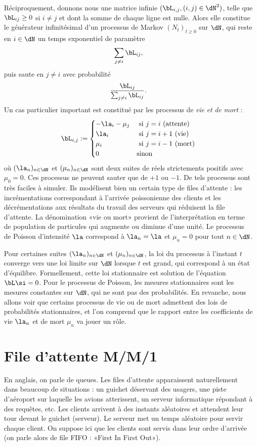 {{Réciproquement, donnons nous une matrice infinie $(\bL_{i,j},(i,j)\in\dN^2)$,
telle que $\bL_{ij}\geq 0$ si $i\neq j$ et dont la somme de chaque ligne est
nulle. Alors elle constitue le générateur infinitésimal d'un processus de
Markov $(N_t)_{t\geq 0}$ sur $\dN$, qui reste en $i\in\dN$ un temps
exponentiel de paramètre
$$
\sum_{j\neq i}\bL_{ij},
$$
puis saute en $j\neq i$ avec probabilité
$$
\frac{\bL_{ij}}{\sum_{j\neq i}\bL_{ij}}.
$$
Un cas particulier important est constitué par les processus de \emph{vie
  et de mort} :
$$
\bL_{i,j}:=
\begin{cases}
  -\la_{i}-\mu_j & \text{ si $j=i$ (attente)} \\
  \la_{i} & \text{ si $j=i+1$ (vie)} \\
  \mu_{i} & \text{ si $j=i-1$ (mort)} \\
  0 & \text{sinon}
\end{cases}
$$
où $(\la_n)_{n\in\dN}$ et $(\mu_n)_{n\in\dN}$ sont deux suites de réels
strictements positifs avec $\mu_0=0$. Ces processus ne peuvent sauter que de
$+1$ ou $-1$. De tels processus sont très faciles à simuler. Ils modélisent
bien un certain type de files d'attente : les incrémentations correspondant à
l'arrivée poissonienne des clients et les décrémentations aux résultats du
travail des serveurs qui réduisent la file d'attente.  La dénomination «vie ou
mort» provient de l'interprétation en terme de population de particules qui
augmente ou diminue d'une unité. Le processus de Poisson d'intensité $\la$
correspond à $\la_n=\la$ et $\mu_n=0$ pour tout $n\in\dN$.

Pour certaines suites $(\la_n)_{n\in\dN}$ et $(\mu_n)_{n\in\dN}$, la loi du
processus à l'instant $t$ converge vers une loi limite sur $\dN$ lorsque $t$
est grand, qui correspond à un état d'équilibre. Formellement, cette loi
stationnaire est solution de l'équation $\bL\si=0$. Pour le processus de
Poisson, les mesures stationnaires sont les mesures constantes sur $\dN$, qui
ne sont pas des probabilités. En revanche, nous allons voir que certains
processus de vie ou de mort admettent des lois de probabilités stationnaires,
et l'on comprend que le rapport entre les coefficients de vie $\la_n$ et de
mort $\mu_n$ va jouer un rôle.

%
\section{File d'attente M/M/1}
%

En anglais, on parle de queues. Les files d'attente apparaissent naturellement
dans beaucoup de situations : un guichet déservant des usagers, une piste
d'aéroport sur laquelle les avions atterissent, un serveur informatique
répondant à des requêtes, etc.  Les clients arrivent à des instants aléatoires
et attendent leur tour devant le guichet (serveur). Le serveur met un temps
aléatoire pour servir chaque client.  On suppose ici que les clients sont
servis dans leur ordre d'arrivée (on parle alors de file FIFO : «First In
First Out»).

}}
